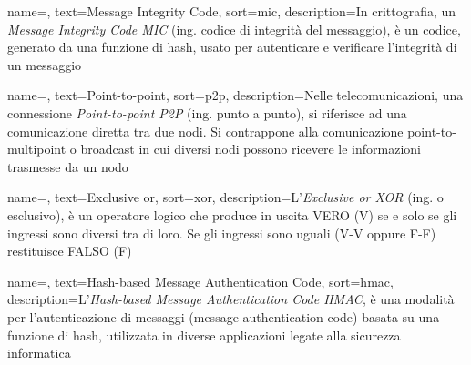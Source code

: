  {
    name=,
    text=Message Integrity Code,
    sort=mic,
    description={In crittografia, un \emph{Message Integrity Code MIC} (ing. codice di integrità del messaggio), è un codice, generato da una funzione di hash, usato per autenticare e verificare l'integrità di un messaggio}
}

 {
    name=,
    text=Point-to-point,
    sort=p2p,
    description={Nelle telecomunicazioni, una connessione \emph{Point-to-point P2P} (ing. punto a punto), si riferisce ad una comunicazione diretta tra due nodi. Si contrappone alla comunicazione point-to-multipoint o broadcast in cui diversi nodi possono ricevere le informazioni trasmesse da un nodo}
}

 {
    name=,
    text=Exclusive or,
    sort=xor,
    description={L'\emph{Exclusive or XOR} (ing. o esclusivo), è un operatore logico che produce in uscita VERO (V) se e solo se gli ingressi sono diversi tra di loro. Se gli ingressi sono uguali (V-V oppure F-F) restituisce FALSO (F)}
}

 {
    name=,
    text=Hash-based Message Authentication Code,
    sort=hmac,
    description={L'\emph{Hash-based Message Authentication Code HMAC}, è una modalità per l'autenticazione di messaggi (message authentication code) basata su una funzione di hash, utilizzata in diverse applicazioni legate alla sicurezza informatica}
}